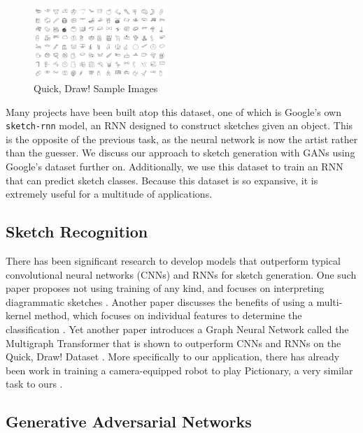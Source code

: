 \documentclass[10pt,twocolumn,letterpaper]{article}
\def\code#1{\texttt{#1}}
\begin{document}
\begin{figure}[H]
  \centering
  \includegraphics[width=0.45\textwidth]{quickdraw_samples.png}
  \caption{Quick, Draw! Sample Images}
\end{figure}

Many projects have been built atop this dataset, one of which is Google’s own \code{sketch-rnn} model, an RNN designed to construct sketches given an object\cite{sketch-rnn}. This is the opposite of the previous task, as the neural network is now the artist rather than the guesser. We discuss our approach to sketch generation with GANs using Google’s dataset further on. Additionally, we use this dataset to train an RNN that can predict sketch classes. Because this dataset is so expansive, it is extremely useful for a multitude of applications.

\subsection{Sketch Recognition}

There has been significant research to develop models that outperform typical convolutional neural networks (CNNs) and RNNs for sketch generation. One such paper proposes not using training of any kind, and focuses on interpreting diagrammatic sketches \cite{sketchRead}. Another paper discusses the benefits of using a multi-kernel method, which focuses on individual features to determine the classification \cite{LI20151}. Yet another paper introduces a Graph Neural Network called the Multigraph Transformer that is shown to outperform CNNs and RNNs on the Quick, Draw! Dataset \cite{9397867}. More specifically to our application, there has already been work in training a camera-equipped robot to play Pictionary, a very similar task to ours \cite{sarvadevabhatla2016enabling}.

\subsection{Generative Adversarial Networks}
\end{document}
